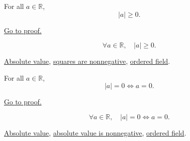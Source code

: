 \begin{theorem}
\label{thm:absolute-value-nonneg}
For all $a \in \mathbb{R}$,
\[
  \lvert a \rvert \ge 0.
\]
\end{theorem}



\begin{remark*}[Proof]
\hyperref[prf:absolute-value-nonneg]{Go to proof.}
\end{remark*}

\begin{remark*}
\[
  \forall a \in \mathbb{R},\quad \lvert a \rvert \ge 0.
\]
\end{remark*}

\begin{dependencies}
\hyperref[def:absolute-value]{Absolute value},
\hyperref[thm:ordered-field-squares-nonnegative]{squares are nonnegative},
\hyperref[def:real-ordered-field]{ordered field}.
\end{dependencies}


\begin{theorem}
\label{thm:absolute-value-zero-iff-zero}
For all $a \in \mathbb{R}$,
\[
  \lvert a \rvert = 0 \iff a = 0.
\]
\end{theorem}



\begin{remark*}[Proof]
\hyperref[prf:absolute-value-zero-iff-zero]{Go to proof.}
\end{remark*}

\begin{remark*}
\[
  \forall a \in \mathbb{R},\quad
  \lvert a \rvert = 0 \iff a = 0.
\]
\end{remark*}

\begin{dependencies}
\hyperref[def:absolute-value]{Absolute value},
\hyperref[thm:absolute-value-nonneg]{absolute value is nonnegative},
\hyperref[def:real-ordered-field]{ordered field}.
\end{dependencies}


